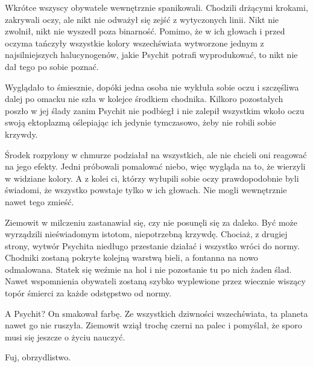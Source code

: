 Wkrótce wszyscy obywatele wewnętrznie spanikowali. Chodzili drżącymi krokami, zakrywali oczy, ale nikt nie odważył się zejść z wytyczonych linii.
Nikt nie zwolnił, nikt nie wyszedł poza binarność.
Pomimo, że w ich głowach i przed oczyma tańczyły wszystkie kolory wszechświata wytworzone jednym z najsilniejszych halucynogenów, 
jakie Psychit potrafi wyprodukować, to nikt nie dał tego po sobie poznać.

Wyglądało to śmiesznie, dopóki jedna osoba nie wykłuła sobie oczu i szczęśliwa dalej po omacku nie szła w kolejce środkiem chodnika.
Kilkoro pozostałych poszło w jej ślady zanim Psychit nie podbiegł i nie zalepił wszystkim wkoło oczu swoją ektoplazmą oślepiając ich jedynie tymczasowo, 
żeby nie robili sobie krzywdy.

Środek rozpylony w chmurze podziałał na wszystkich, ale nie chcieli oni reagować na jego efekty.
Jedni próbowali pomalować niebo, więc wygląda na to, że wierzyli w widziane kolory.
A z kolei ci, którzy wyłupili sobie oczy prawdopodobnie byli świadomi, że wszystko powstaje tylko w ich głowach.
Nie mogli wewnętrznie nawet tego zmieść.

Ziemowit w milczeniu zastanawiał się, czy nie posunęli się za daleko.
Być może wyrządzili nieświadomym istotom, niepotrzebną krzywdę.
Chociaż, z drugiej strony, wytwór Psychita niedługo przestanie działać i wszystko wróci do normy.
Chodniki zostaną pokryte kolejną warstwą bieli, a fontanna na nowo odmalowana.
Statek się weźmie na hol i nie pozostanie tu po nich żaden ślad.
Nawet wspomnienia obywateli zostaną szybko wyplewione przez wiecznie wiszący topór śmierci za każde odstępstwo od normy.

A Psychit? On smakował farbę. 
Ze wszystkich dziwności wszechświata, ta planeta nawet go nie ruszyła.
Ziemowit wziął trochę czerni na palec i pomyślał, że sporo musi się jeszcze o życiu nauczyć.

Fuj, obrzydlistwo.







